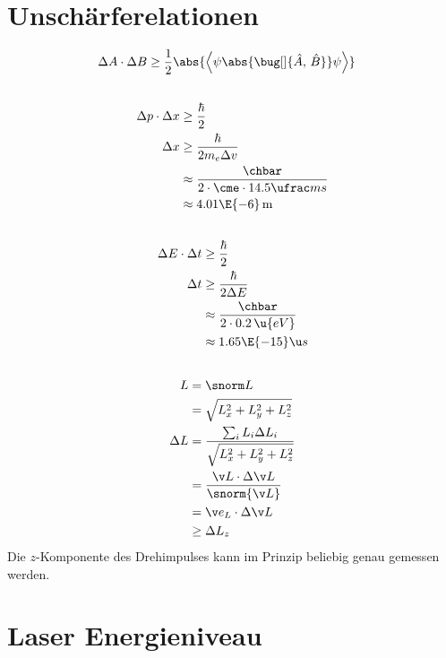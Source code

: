 \documentclass[ex,minted]{exercise_3.1}
\begin{document}
\section{Unschärferelationen}
\begin{align*}
    \Delta A \cdot \Delta B &\ge \frac12 \abs{\left\langle{\psi\abs{\bug[]{\hat A,\, \hat B}}\psi}\right\rangle}
\end{align*}
\subsection{}
\begin{align*}
    \Delta p \cdot \Delta x &\ge \frac\hbar2\\
    \Delta x &\ge \frac{\hbar}{2m_e\Delta v } \\
    &\approx \frac{\chbar}{2\cdot \cme \cdot 14.5 \ufrac ms}\\
    &\approx 4.01 \E{-6} \,\mathrm  m
\end{align*}

\subsection{}
\begin{align*}
    \Delta E \cdot \Delta t &\ge \frac{\hbar}{2}\\
    \Delta t &\ge \frac{\hbar}{2 \Delta E}\\
    &\approx \frac{\chbar}{2 \cdot 0.2 \,\u{eV}}\\
    &\approx 1.65\E{-15} \u s
\end{align*}

\subsection{}
\begin{align*}
    L &= \snorm L \\
    &= \sqrt{L_x^2 + L_y^2 + L_z ^2}\\
    \Delta L &=\frac{\sum_iL_i \Delta L_i}{\sqrt{L_x^2 + L_y^2 + L_z ^2}}\\
    &=\frac{\v L \cdot \Delta \v L}{\snorm {\v L}}\\
    &= \v e_L\cdot \Delta \v L\\
    &\ge \Delta L_z
\end{align*}
Die \(z\)-Komponente des Drehimpulses kann im Prinzip beliebig genau gemessen werden.

\section{Laser Energieniveau}
\end{document}
